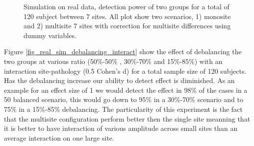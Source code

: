 \documentclass[authoryear]{elsarticle}
\begin{document}
\begin{figure}[tbp]
\centering
\captionsetup[subfloat]{labelformat=empty}
\hspace{1mm}
\hspace{1mm}
\hspace{1mm}
\caption{
Simulation on real data, detection power of two groups for a total of 120 subject between 7 sites. All plot show two scenarios, 1) monosite and 2) multisite 7 sites with correction for multisite differences using dummy variables.
}
\label{fig_real_sim_debalancing}
\end{figure}

Figure \ref{fig_real_sim_debalancing_interact} show the effect of debalancing the two groups at various ratio (50\%-50\% , 30\%-70\% and 15\%-85\%) with an interaction site-pathology (0.5 Cohen's d) for a total sample size of 120 subjects. Has the debalancing increase our ability to detect effect is diminished. As an example for an effect size of 1 we would detect the effect in 98\% of the cases in a 50 balanced scenario, this would go down to 95\% in a 30\%-70\% scenario and to 75\% in a 15\%-85\% debalancing. The particularity of this experiment is the fact that the multisite configuration perform better then the single site meanning that it is better to have interaction of various amplitude across small sites than an average interaction on one large site.
\end{document}
